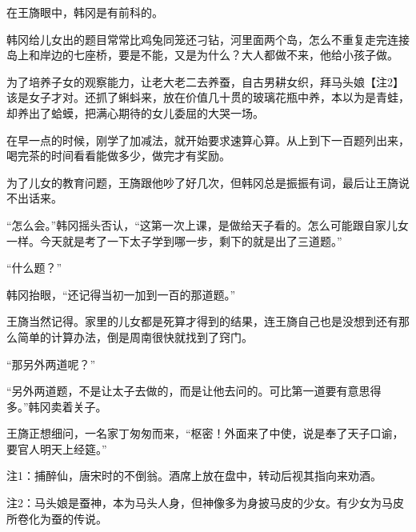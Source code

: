 在王旖眼中，韩冈是有前科的。

韩冈给儿女出的题目常常比鸡兔同笼还刁钻，河里面两个岛，怎么不重复走完连接岛上和岸边的七座桥，要是不能，又是为什么？大人都做不来，他给小孩子做。

为了培养子女的观察能力，让老大老二去养蚕，自古男耕女织，拜马头娘【注2】该是女子才对。还抓了蝌蚪来，放在价值几十贯的玻璃花瓶中养，本以为是青蛙，却养出了蛤蟆，把满心期待的女儿委屈的大哭一场。

在早一点的时候，刚学了加减法，就开始要求速算心算。从上到下一百题列出来，喝完茶的时间看看能做多少，做完才有奖励。

为了儿女的教育问题，王旖跟他吵了好几次，但韩冈总是振振有词，最后让王旖说不出话来。

“怎么会。”韩冈摇头否认，“这第一次上课，是做给天子看的。怎么可能跟自家儿女一样。今天就是考了一下太子学到哪一步，剩下的就是出了三道题。”

“什么题？”

韩冈抬眼，“还记得当初一加到一百的那道题。”

王旖当然记得。家里的儿女都是死算才得到的结果，连王旖自己也是没想到还有那么简单的计算办法，倒是周南很快就找到了窍门。

“那另外两道呢？”

“另外两道题，不是让太子去做的，而是让他去问的。可比第一道要有意思得多。”韩冈卖着关子。

王旖正想细问，一名家丁匆匆而来，“枢密！外面来了中使，说是奉了天子口谕，要官人明天上经筵。”

注1：捕醉仙，唐宋时的不倒翁。酒席上放在盘中，转动后视其指向来劝酒。

注2：马头娘是蚕神，本为马头人身，但神像多为身披马皮的少女。有少女为马皮所卷化为蚕的传说。

